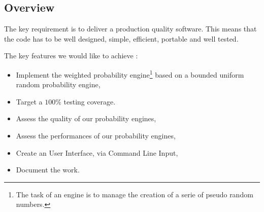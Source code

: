 \documentclass[12pt,a4paper,article]{memoir} %
\begin{document}
\subsection{Overview}

The key requirement is to deliver a production quality software.
This means that the code has to be well designed, simple, 
efficient, portable and well tested.

The key features we would like to achieve :
\begin{itemize}
	\item Implement the weighted probability engine\footnote{
		The task of an engine is to manage the creation of a serie of
		pseudo random numbers.} based
		on a bounded uniform random probability engine,
	\item Target a $100\%$ testing coverage.
	\item Assess the quality of our probability engines,
	\item Assess the performances of our probability engines,
	\item Create an User Interface, via Command Line Input,
	\item Document the work.
\end{itemize}
\end{document}
